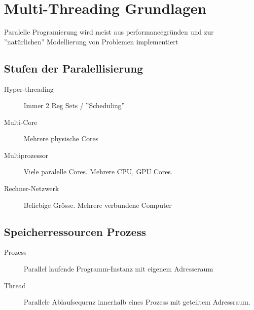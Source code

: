 


\newcommand{\SUBJECT}{Zusammenfassung}
\newcommand{\TITLE}{Paralelle Programmierung}




\section{Multi-Threading Grundlagen}
Paralelle Programierung wird meist aus performancegründen und zur ''natürlichen'' Modellierung von Problemen implementiert

\subsection{Stufen der Paralellisierung}

\begin{description}
	\item[Hyper-threading] Immer 2 Reg Sets / ''Scheduling''
	\item[Multi-Core] Mehrere physische Cores
	\item[Multiprozessor] Viele paralelle Cores. Mehrere CPU, GPU Cores.
	\item[Rechner-Netzwerk] Beliebige Grösse. Mehrere verbundene Computer
\end{description}


\subsection{Speicherressourcen Prozess}

\begin{description}
	\item[Prozess] Parallel laufende Programm-Instanz mit eigenem Adresseraum
	\item[Thread] Parallele Ablaufsequenz innerhalb eines Prozess mit geteiltem Adressraum. 
\end{description}

